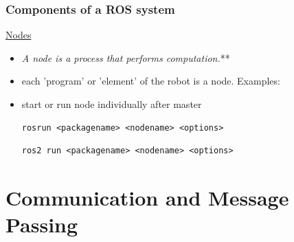 \documentclass[fleqn]{beamer} %
\newcommand{\sectiontitleI}{Components of a ROS system} %
\newcommand{\sectiontitleII}{Communication and Message Passing}
\begin{document}
	\begin{frame}[containsverbatim] \small
		\frametitle{\sectiontitleI}
\href{http://wiki.ros.org/Nodes}{Nodes}             
                \begin{itemize}
                    \item {\it A node is a process that performs computation.}** 
                    \item each 'program' or 'element' of the robot is a node. Examples:
                        \begin{itemize} 
                        \end{itemize}
                    \item start or run node individually after master\vspace{5mm}\\
                    \begin{lstlisting}
rosrun <packagename> <nodename> <options> 
                    \end{lstlisting} 
                    
                    \begin{lstlisting}
ros2 run <packagename> <nodename> <options> 
                    \end{lstlisting} 
                  
                                      
                \end{itemize}
	\end{frame}

\section{\sectiontitleII}
\end{document}
